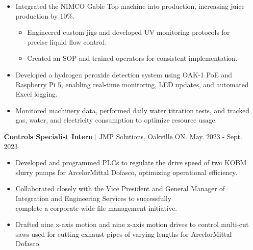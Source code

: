 \documentclass{article}
\begin{document}
\vspace{-0.2cm}
\begin{itemize}[leftmargin=1.5cm]
    \item Integrated the NIMCO Gable Top machine into production, increasing juice production by 10\%.
    \vspace{-0.2cm}
    \begin{itemize} [label=$\circ$, leftmargin=0.5cm]
        \item Engineered custom jigs and developed UV monitoring protocols for precise liquid flow control.
        \item Created an SOP and trained operators for consistent implementation.
        
    \end{itemize}

    \vspace{-0.1cm}
    \item Developed a hydrogen peroxide detection system using OAK-1 PoE and Raspberry Pi 5, enabling real-time monitoring, LED updates, and automated Excel logging.

    \vspace{-0.1cm}
    \item Monitored machinery data, performed daily water titration tests, and tracked gas, water, and electricity consumption to optimize resource usage.
    
\end{itemize}

\textbf{\hspace{-0.10cm} Controls Specialist Intern} | JMP Solutions, Oakville ON. \hspace{5.3cm} {\small May. 2023 - Sept. 2023}

\vspace{-0.2cm}
\begin{itemize}[leftmargin=1.5cm]
    \item Developed and programmed PLCs to regulate the drive speed of two KOBM slurry pumps for ArcelorMittal Dofasco, optimizing operational efficiency.

    \vspace{-0.1cm}

    \item Collaborated closely with the Vice President and General Manager of Integration and Engineering Services to successfully \\ complete a corporate-wide file management initiative.

    \vspace{-0.1cm}

    \item Drafted nine x-axis motion and nine z-axis motion drives to control multi-cut saws used for cutting exhaust pipes of varying lengths for ArcelorMittal Dofasco.

\end{itemize}
\end{document}
